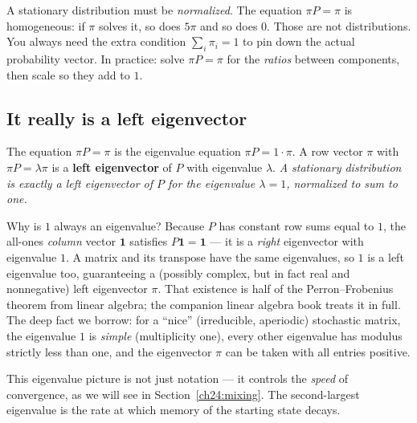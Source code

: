 \begin{trapbox}
A stationary distribution must be \emph{normalized}. The equation $\pi P = \pi$ is
homogeneous: if $\pi$ solves it, so does $5\pi$ and so does $0$. Those are not
distributions. You always need the extra condition $\sum_i \pi_i = 1$ to pin down
the actual probability vector. In practice: solve $\pi P = \pi$ for the
\emph{ratios} between components, then scale so they add to $1$.
\end{trapbox}

\subsection{It really is a left eigenvector}

\begin{connectionbox}
The equation $\pi P = \pi$ is the eigenvalue equation $\pi P = 1\cdot\pi$. A row
vector $\pi$ with $\pi P = \lambda \pi$ is a \textbf{left eigenvector} of $P$ with
eigenvalue $\lambda$. \emph{A stationary distribution is exactly a left
eigenvector of $P$ for the eigenvalue $\lambda = 1$, normalized to sum to one.}

Why is $1$ always an eigenvalue? Because $P$ has constant row sums equal to $1$,
the all-ones \emph{column} vector $\mathbf{1}$ satisfies $P\mathbf{1} = \mathbf{1}$
--- it is a \emph{right} eigenvector with eigenvalue $1$. A matrix and its
transpose have the same eigenvalues, so $1$ is a left eigenvalue too, guaranteeing
a (possibly complex, but in fact real and nonnegative) left eigenvector $\pi$.
That existence is half of the Perron--Frobenius theorem from linear algebra; the
companion linear algebra book treats it in full. The deep fact we borrow: for a
``nice'' (irreducible, aperiodic) stochastic matrix, the eigenvalue $1$ is
\emph{simple} (multiplicity one), every other eigenvalue has modulus strictly
less than one, and the eigenvector $\pi$ can be taken with all entries positive.
\end{connectionbox}

This eigenvalue picture is not just notation --- it controls the \emph{speed} of
convergence, as we will see in Section~\ref{ch24:mixing}. The second-largest
eigenvalue is the rate at which memory of the starting state decays.

